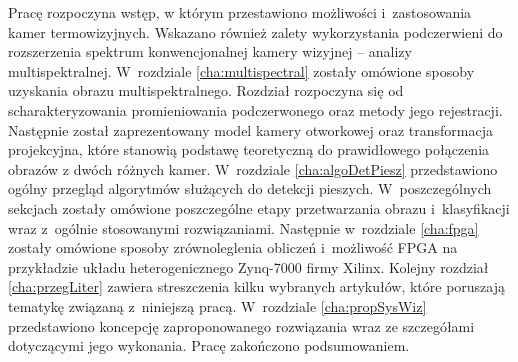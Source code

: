 Pracę rozpoczyna wstęp, w którym przestawiono możliwości i~zastosowania kamer termowizyjnych. 
Wskazano również zalety wykorzystania podczerwieni do rozszerzenia spektrum konwencjonalnej kamery wizyjnej -- analizy multispektralnej.
W~rozdziale \ref{cha:multispectral} zostały omówione sposoby uzyskania obrazu multispektralnego. 
Rozdział rozpoczyna się od scharakteryzowania promieniowania podczerwonego oraz metody jego rejestracji. 
Następnie został zaprezentowany model kamery otworkowej oraz transformacja projekcyjna, które stanowią podstawę teoretyczną do prawidłowego połączenia obrazów z dwóch różnych kamer.
W~rozdziale \ref{cha:algoDetPiesz} przedstawiono ogólny przegląd algorytmów służących do detekcji pieszych. 
W~poszczególnych sekcjach zostały omówione poszczególne etapy przetwarzania obrazu i~klasyfikacji wraz z~ogólnie stosowanymi rozwiązaniami.%
Następnie w~rozdziale \ref{cha:fpga} zostały omówione sposoby zrównoleglenia obliczeń i~możliwość FPGA na przykładzie układu heterogenicznego Zynq-7000 firmy Xilinx.
Kolejny rozdział \ref{cha:przegLiter} zawiera streszczenia kilku wybranych artykułów, które poruszają tematykę związaną z~niniejszą pracą.
W~rozdziale \ref{cha:propSysWiz} przedstawiono koncepcję zaproponowanego rozwiązania wraz ze szczegółami dotyczącymi jego wykonania.
Pracę zakończono podsumowaniem.


